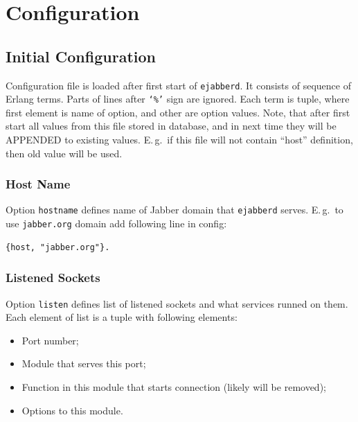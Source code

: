 \documentclass[10pt]{article}
\newcommand{\ejabberd}{\texttt{ejabberd}}
\newcommand{\Jabber}{Jabber}
\begin{document}
\section{Configuration}
\label{sec:configuration}

\subsection{Initial Configuration}
\label{sec:initconfig}

%

Configuration file is loaded after first start of \ejabberd{}.  It consists of
sequence of Erlang terms.  Parts of lines after \texttt{`\%'} sign are ignored.
Each term is tuple, where first element is name of option, and other are option
values.  Note, that after first start all values from this file stored in
database, and in next time they will be APPENDED to existing values.  E.\,g.\
if this file will not contain ``host'' definition, then old value will be
used.


\subsubsection{Host Name}
\label{sec:confighostname}

Option \texttt{hostname} defines name of \Jabber{} domain that \ejabberd{}
serves.  E.\,g.\ to use \texttt{jabber.org} domain add following line in config:
\begin{verbatim}
{host, "jabber.org"}.
\end{verbatim}




\subsubsection{Listened Sockets}
\label{sec:configlistened}

Option \texttt{listen} defines list of listened sockets and what services
runned on them.  Each element of list is a tuple with following elements:
\begin{itemize}
\item Port number;
\item Module that serves this port;
\item Function in this module that starts connection (likely will be removed);
\item Options to this module.
\end{itemize}
\end{document}
